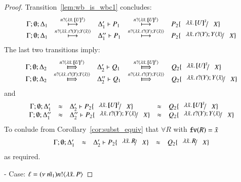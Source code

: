 \begin{proof}
	\noi Transition~\ref{lem:wb_is_wbc1} concludes:
%
\[
	\begin{array}{rclcl}
		\Gamma; \es; \Delta_1 &\hby{\bactinp{n}{\abs{\tilde{x}}{\map{U}^{\tilde{x}}}}}& \Delta_1' \proves P_1 &\hby{\bactinp{n}{\abs{\tilde{x}}{\map{U}^{\tilde{x}}}}}& P_2 \subst{\abs{\tilde{x}}{\map{U}^{\tilde{x}}}}{X}\\
		\Gamma; \es; \Delta_1 &\hby{\bactinp{n}{\abs{\tilde{x}}{\binp{t}{Y} \appl{Y}{\tilde{x}}}}}& \Delta_1'' \proves P_1 &\hby{\bactinp{n}{\abs{\tilde{x}}{\binp{t}{Y} \appl{Y}{\tilde{x}}}}}& P_2 \subst{\abs{\tilde{x}}{\binp{t}{Y} \appl{Y}{\tilde{x}}}}{X}
	\end{array}
\]
%
	\noi The last two transitions imply:
%
\[
	\begin{array}{rclcl}
		\Gamma; \es; \Delta_2 &\Hby{\bactinp{n}{\abs{\tilde{x}}{\map{U}^{\tilde{x}}}}}& \Delta_2' \proves Q_1 &\Hby{\bactinp{n}{\abs{\tilde{x}}{\map{U}^{\tilde{x}}}}}& Q_2 \subst{\abs{\tilde{x}}{\map{U}^{\tilde{x}}}}{X}\\
		\Gamma; \es; \Delta_2 &\Hby{\bactinp{n}{\abs{\tilde{x}}{\binp{t}{Y} \appl{Y}{\tilde{x}}}}}& \Delta_2'' \proves Q_1 &\Hby{\bactinp{n}{\abs{\tilde{x}}{\binp{t}{Y} \appl{Y}{\tilde{x}}}}}& Q_2 \subst{\abs{\tilde{x}}{\binp{t}{Y} \appl{Y}{\tilde{x}}}}{X}
	\end{array}
\]
%
	\noi and
\[
	\begin{array}{rclcl}
		\Gamma; \es; \Delta_1' &\wb& \Delta_2' \proves P_2 \subst{\abs{\tilde{x}}{\map{U}^{\tilde{x}}}}{X} &\wb& Q_2 \subst{\abs{\tilde{x}}{\map{U}^{\tilde{x}}}}{X}\\
		\Gamma; \es; \Delta_1'' &\wb& \Delta_2'' \proves P_2 \subst{\abs{\tilde{x}}{\binp{t}{Y} \appl{Y}{\tilde{x}}}}{X} &\wb& Q_2 \subst{\abs{\tilde{x}}{\binp{t}{Y} \appl{Y}{\tilde{x}}}}{X}
	\end{array}
\]
%
	\noi To conlude from Corollary~\ref{cor:subst_equiv} that
	$\forall R$ with $\mathtt{fv}(R) = \tilde{x}$
\[
	\begin{array}{rclcl}
		\Gamma; \es; \Delta_1' &\wb& \Delta_2' \proves P_2 \subst{\abs{\tilde{x}}{R}}{X} &\wb& Q_2 \subst{\abs{\tilde{x}}{R}}{X}\\
	\end{array}
\]
	\noi as required.

	\noi - Case: $\ell = (\nu\ \tilde{m_1}) n ! \langle \lambda \tilde{x}.\,P \rangle$


\end{proof}
